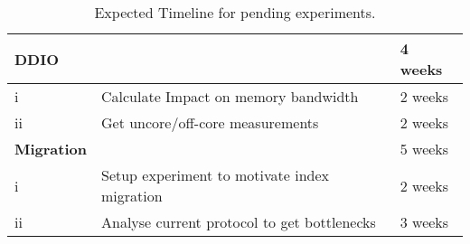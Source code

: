 \begin{table}[t]
\def\arraystretch{1.25}%
\begin{tabular}{lll}
\toprule
\textbf{DDIO} & & 4 weeks \\
\midrule
i & Calculate Impact on memory bandwidth & 2 weeks \\
ii & Get uncore/off-core measurements  & 2 weeks \\
\midrule
\textbf{Migration} & & 5 weeks\\
\midrule
i & Setup experiment to motivate index migration & 2 weeks \\
ii & Analyse current protocol to get bottlenecks & 3 weeks \\
\bottomrule
\end{tabular}
\vspace{0.25eX}
\caption{Expected Timeline for pending experiments.}
\label{tbl:timeline}
\end{table}